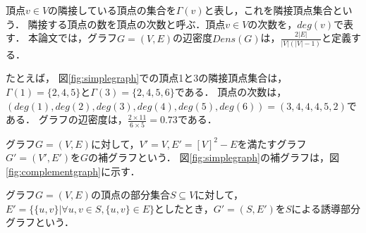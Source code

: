 頂点$v \in V$の隣接している頂点の集合を$\Gamma (v) $と表し，これを隣接頂点集合という．
隣接する頂点の数を頂点の次数と呼ぶ．頂点$v \in V$の次数を，$deg(v)$で表す．
本論文では，グラフ$G=(V,E)$の辺密度$Dens(G)$は，$\frac{2|E|}{|V|(|V|-1)}$と定義する．

たとえば，
図\ref{fig:simplegraph}での頂点1と3の隣接頂点集合は，$\Gamma (1) = \{ 2,4,5 \}$と$\Gamma (3 ) = \{2,4,5,6 \}$である．
頂点の次数は，$(deg(1),deg(2),deg(3),deg(4),deg(5),deg(6)) =(3,4,4,4,5,2)$である．
グラフの辺密度は，$\frac{ 2 \times 11 }{ 6 \times 5 } = 0.73$である．

グラフ$G=(V,E)$に対して，$V' = V, E' = [V]^2 - E$を満たすグラフ$G'=(V',E')$を$G$の補グラフという．
図\ref{fig:simplegraph}の補グラフは，図\ref{fig:complementgraph}に示す．

\begin{comment}
(2.1)，(2.2)の条件を満たすとき，グラフ$G'=(V',E')$は，グラフ$G=(V,E)$の補グラフである．
$V'$は次の条件を満たす．
\begin{equation}
    V' = V 
\end{equation}

頂点集合$V$の完全グラフ$K_{|V|}=(V,E_K)$としたとき，$E'$は次の条件を満たす．
\begin{equation}
    E' = E_K - E
\end{equation}
図\ref{fig:simplegraph}の補グラフは，図\ref{fig:complementgraph}に示す．
\end{comment}

グラフ$G = (V,E)$の頂点の部分集合$S \subseteq V$に対して，
$E'=\{ \{ u , v \} | \forall u , v \in S , \{ u,v\} \in E \}$としたとき，$G' =(S,E')$を$S$による誘導部分グラフという．

